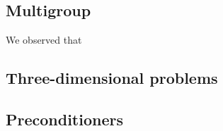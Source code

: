\subsection{Multigroup}

We observed that 

\subsection{Three-dimensional problems}

\subsection{Preconditioners}

